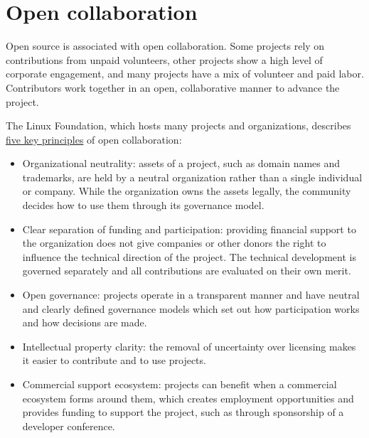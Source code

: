 


\chapter{Open collaboration}

Open source is associated with open collaboration.  Some projects rely on contributions from unpaid volunteers, other projects show a high level of corporate engagement, and many projects have a mix of volunteer and paid labor.  Contributors work together in an open, collaborative manner to advance the project.

The Linux Foundation, which hosts many projects and organizations, describes \href{https://www.linuxfoundation.org/blog/the-linux-foundation-its-not-just-the-linux-operating-system/}{five key principles} of open collaboration:

\begin{itemize}

\itemsep 0.5em

\item Organizational neutrality: assets of a project, such as domain names and trademarks, are held by a neutral organization rather than a single individual or company.  While the organization owns the assets legally, the community decides how to use them through its governance model.

\item Clear separation of funding and participation: providing financial support to the organization does not give companies or other donors the right to influence the technical direction of the project.  The technical development is governed separately and all contributions are evaluated on their own merit.

\item Open governance: projects operate in a transparent manner and have neutral and clearly defined governance models which set out how participation works and how decisions are made.

\item Intellectual property clarity: the removal of uncertainty over licensing makes it easier to contribute and to use projects.

\item Commercial support ecosystem: projects can benefit when a commercial ecosystem forms around them, which creates employment opportunities and provides funding to support the project, such as through sponsorship of a developer conference.

\end{itemize}


